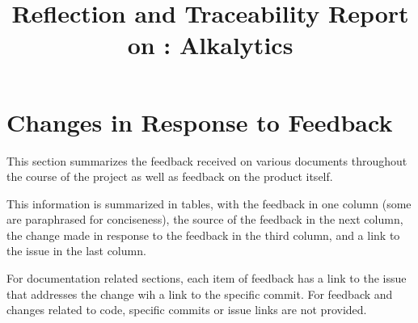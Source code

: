 \documentclass{article}
\title{Reflection and Traceability Report on \progname: Alkalytics}
\author{\authname}
\date{}
\begin{document}
\maketitle


\section{Changes in Response to Feedback}
This section summarizes the feedback received on various documents throughout
the course of the project as well as feedback on the product itself.

This information is summarized in tables, with the feedback in one
column (some are paraphrased for conciseness), the source of the feedback in the
next column, the change made in response to the feedback in the third column,
and a link to the issue in the last column. 

For documentation related sections, each item of feedback has a
link to the issue that addresses the change wih a link to the specific commit.
For feedback and changes related to code, specific commits or issue links are
not provided.



\end{document}
